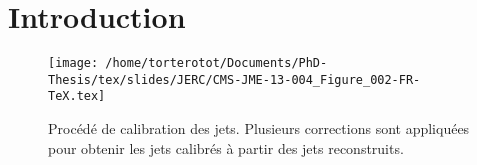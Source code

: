 \section{Introduction}

\begin{figure}[h]
\centering
\texttt{[image: /home/torterotot/Documents/PhD-Thesis/tex/slides/JERC/CMS-JME-13-004\_Figure\_002-FR-TeX.tex]}
\caption{Procédé de calibration des jets. Plusieurs corrections sont appliquées pour obtenir les jets calibrés à partir des jets reconstruits.}
\label{fig-CMS-JME-13-004_Figure_002-FR-TeX}
\end{figure}